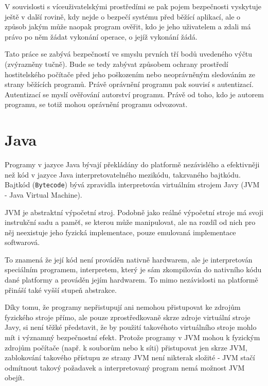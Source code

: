 V souvislosti s víceuživatelskými prostředími se pak pojem bezpečnosti vyskytuje ještě v další rovině, kdy nejde o bezpečí systému před běžící aplikací, ale o způsob jakým může naopak program ověřit, kdo je jeho uživatelem a zdali má právo po něm žádat vykonání operace, o jejíž vykonání žádá.

Tato práce se zabývá bezpečností ve smyslu prvních tří bodů uvedeného výčtu (zvýrazněny tučně). Bude se tedy zabývat způsobem ochrany prostředí hostitelského počítače před jeho poškozením nebo neoprávněným sledováním ze strany běžících programů. Právě oprávnění programu pak souvisí s autentizací. Autentizací se myslí ověřování autorství programu. Právě od toho, kdo je autorem programu, se totiž mohou oprávnění programu odvozovat.

\section{Java}

Programy v jazyce Java bývají překládány do platformě nezávislého a efektivněji než kód v jazyce Java interpretovatelného mezikódu, takzvaného bajtkódu.
Bajtkód ({\tt Bytecode}) bývá zpravidla interpretován virtuálním strojem Javy (JVM - Java Virtual Machine).

JVM je abstraktní výpočetní stroj. Podobně jako reálné výpočetní stroje má svoji instrukční sadu a paměť, se kterou může manipulovat, ale na rozdíl od nich pro něj neexistuje jeho fyzická implementace, pouze emulovaná implementace softwarová.

To znamená že její kód není prováděn nativně hardwarem, ale je interpretován speciálním programem, interpretem, který je sám zkompilován do nativního kódu dané platformy a prováděn jejím hardwarem.
To mimo nezávislosti na platformě přináší také vyšší stupeň abstrakce.

Díky tomu, že programy nepřistupují ani nemohou přistupovat ke zdrojům fyzického stroje přímo, ale pouze zprostředkovaně skrze zdroje virtuální stroje Javy, si není těžké představit, že by použití takovéhoto virtuálního stroje mohlo mít i významný bezpečnostní efekt.
Protože programy v JVM mohou k fyzickým zdrojům počítače (např. k souborům nebo k síti) přistupovat jen skrze JVM, zablokování takového přístupu ze strany JVM není nikterak složité - JVM stačí odmítnout takový požadavek a interpretovaný program nemá možnost JVM obejít.

